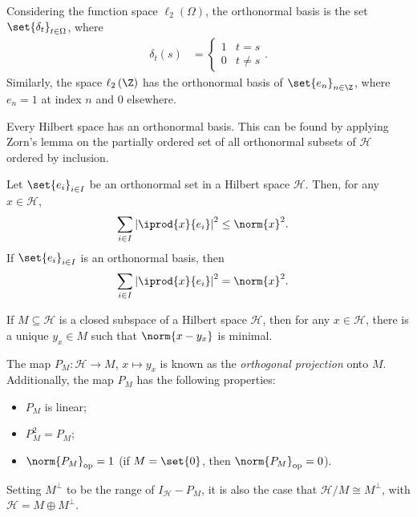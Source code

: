 \begin{example}\label{ex:orthonormal_bases}
  Considering the function space $\ell_2\left( \Omega \right)$, the orthonormal basis is the set $\set{\delta_t}_{t\in\Omega}$, where
  \begin{align*}
    \delta_{t}\left( s \right) &=  \begin{cases}
      1 & t = s\\
      0 & t\neq s
    \end{cases}.
  \end{align*}
  Similarly, the space $\ell_2\left( \Z \right)$ has the orthonormal basis of $\set{e_n}_{n\in\Z}$, where $e_n = 1$ at index $n$ and $0$ elsewhere.
\end{example}
\begin{remark}
  Every Hilbert space has an orthonormal basis. This can be found by applying Zorn's lemma on the partially ordered set of all orthonormal subsets of $\mathcal{H}$ ordered by inclusion.
\end{remark}
\begin{theorem}
  Let $\set{e_i}_{i\in I}$ be an orthonormal set in a Hilbert space $\mathcal{H}$. Then, for any $x\in \mathcal{H}$,
  \begin{align*}
    \sum_{i\in I} \left\vert \iprod{x}{e_i} \right\vert^2 &\leq \norm{x}^2.
  \end{align*}
  If $\set{e_i}_{i\in I}$ is an orthonormal basis, then
  \begin{align*}
    \sum_{i\in I} \left\vert \iprod{x}{e_i} \right\vert^2 &= \norm{x}^2.
  \end{align*}
\end{theorem}
\begin{theorem}\label{thm:projection_theorem}
  If $M\subseteq \mathcal{H}$ is a closed subspace of a Hilbert space $\mathcal{H}$, then for any $x\in \mathcal{H}$, there is a unique $y_x\in M$ such that $\norm{x-y_x}$ is minimal.\newline

  The map $P_M\colon \mathcal{H}\rightarrow M$, $x\mapsto y_x$ is known as the \textit{orthogonal projection} onto $M$. Additionally, the map $P_M$ has the following properties:
  \begin{itemize}
    \item $P_M$ is linear;
    \item $P_M^2 = P_M$;
    \item $\norm{P_M}_{\op} = 1$ (if $M = \set{0}$, then $\norm{P_M}_{\op} = 0$).
  \end{itemize}
  Setting $M^{\perp}$ to be the range of $I_{\mathcal{H}} - P_M$, it is also the case that $\mathcal{H}/M \cong M^{\perp}$, with $\mathcal{H} = M\oplus M^{\perp}$.
\end{theorem}
